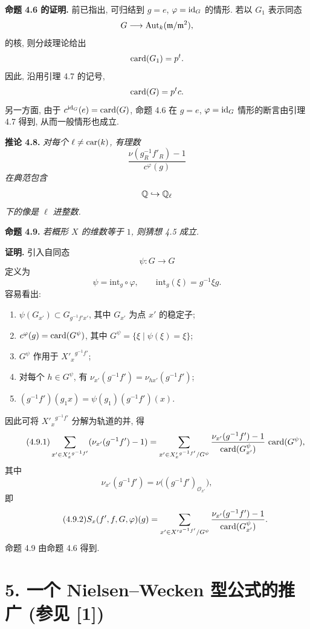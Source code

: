 \medskip
\noindent
\textbf{命题 4.6 的证明.} 前已指出, 可归结到 $g=e$, $\varphi=\operatorname{id}_G$ 的情形. 若以 $G_1$ 表示同态
\[
G\longrightarrow\operatorname{Aut}_k(\mathfrak m/\mathfrak m^2),
\]
的核, 则分歧理论给出
\[
\operatorname{card}(G_1)=p^t.
\]
因此, 沿用引理 4.7 的记号,
\[
\operatorname{card}(G)=p^tc.
\]
另一方面, 由于 $c^{\operatorname{id}_G}(e)=\operatorname{card}(G)$, 命题 4.6 在 $g=e$, $\varphi=\operatorname{id}_G$ 情形的断言由引理 4.7 得到, 从而一般情形也成立.

\medskip
\noindent
\textbf{推论 4.8.} \emph{对每个 $\ell\ne\operatorname{car}(k)$, 有理数
\[
\frac{\nu(g_R^{-1}f'_R)-1}{c^\varphi(g)}
\]
在典范包含
\[
\mathbb Q\hookrightarrow \mathbb Q_\ell
\]
下的像是 $\ell$ 进整数.}

\medskip
\noindent
\textbf{命题 4.9.} \emph{若概形 $X$ 的维数等于 $1$, 则猜想 4.5 成立.}

\medskip
\noindent
\textbf{证明.} 引入自同态
\[
\psi:G\longrightarrow G
\]
定义为
\[
\psi=\mathrm{int}_g\circ\varphi,
\qquad \mathrm{int}_g(\xi)=g^{-1}\xi g.
\]
容易看出:
\begin{enumerate}
\item[i)] $\psi(G_{x'})\subset G_{g^{-1}f'x'}$, 其中 $G_{x'}$ 为点 $x'$ 的稳定子;
\item[ii)] $c^\varphi(g)=\operatorname{card}(G^\psi)$, 其中 $G^\psi=\{\xi\mid\psi(\xi)=\xi\}$;
\item[iii)] $G^\psi$ 作用于 ${X'_x}^{g^{-1}f'}$;
\item[iv)] 对每个 $h\in G^\psi$, 有 $\nu_{x'}(g^{-1}f')=\nu_{hx'}(g^{-1}f')$;
\item[v)] $(g^{-1}f')(g_1x)=\psi(g_1)(g^{-1}f')(x)$.
\end{enumerate}
因此可将 ${X'_x}^{g^{-1}f'}$ 分解为轨道的并, 得
\begin{equation}\tag{4.9.1}
\sum_{x'\in {X'_x}^{g^{-1}f'}}(\nu_{x'}(g^{-1}f')-1)
=
\sum_{x'\in {X'_x}^{g^{-1}f'}/G^\psi}
\frac{\nu_{x'}(g^{-1}f')-1}{\operatorname{card}(G^\psi_{x'})}\,\operatorname{card}(G^\psi),
\end{equation}
其中
\[
\nu_{x'}(g^{-1}f')=\nu\bigl((g^{-1}f')_{\mathcal O_{x'}}\bigr),
\]
即
\begin{equation}\tag{4.9.2}
S_x(f',f,G,\varphi)(g)=\sum_{x'\in {X'}^{g^{-1}f'}/G^\psi}
\frac{\nu_{x'}(g^{-1}f')-1}{\operatorname{card}(G^\psi_{x'})}.
\end{equation}
命题 4.9 由命题 4.6 得到.

\section*{5. 一个 Nielsen--Wecken 型公式的推广 {\normalfont (参见 [1])}}

